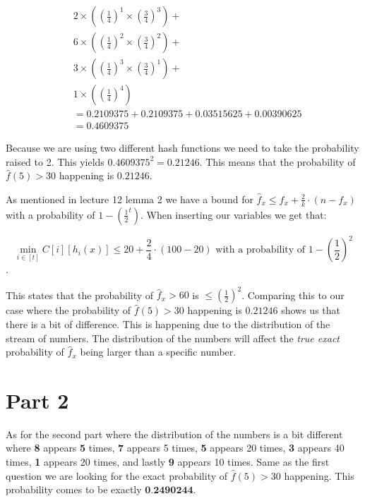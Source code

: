 \documentclass{article}
\begin{document}
\begin{align*}
&2 \times \left(\left(\frac{1}{4}\right)^1 \times \left(\frac{3}{4}\right)^3\right) + \\
&6 \times \left(\left(\frac{1}{4}\right)^2 \times \left(\frac{3}{4}\right)^2\right) + \\
&3 \times \left(\left(\frac{1}{4}\right)^3 \times \left(\frac{3}{4}\right)^1\right) + \\
&1 \times \left(\left(\frac{1}{4}\right)^4\right) \\
&= 0.2109375 + 0.2109375 + 0.03515625 + 0.00390625 \\
&= 0.4609375
\end{align*}

\noindent Because we are using two different hash functions we need to take the probability raised to 2. This yields \(0.4609375^2 = 0.21246\). This means that the probability of \(\hat{f}(5) > 30\) happening is \(0.21246\).

\noindent As mentioned in lecture 12 lemma 2 \cite{Lecture12} we have a bound for \(\hat{f}_x \leq f_x + \frac{2}{k} \cdot (n - f_x)\) with a probability of \(1-\left(\frac{1}{2}^t\right)\). When inserting our variables we get that:


\[\min_{i \in [t]} C[i][h_i(x)] \leq 20 + \frac{2}{4} \cdot (100 - 20) \text{ with a probability of } 1 - \left(\frac{1}{2}\right)^2\].

\noindent This states that the probability of \(\hat{f}_x > 60\) is \(\leq \left(\frac{1}{2}\right)^2\). Comparing this to our case where the probability of \(\hat{f}(5) > 30\) happening is \(0.21246\) shows us that there is a bit of difference. This is happening due to the distribution of the stream of numbers. The distribution of the numbers will affect the \textit{true exact} probability of \(\hat{f}_x\) being larger than a specific number.

\section{Part 2}
As for the second part where the distribution of the numbers is a bit different where \textbf{8} appears
\textbf{5} times,\textbf{ 7} appears 5 times, \textbf{5} appears 20 times,\textbf{ 3} appears 40 times,\textbf{ 1 }appears 20 times, and lastly \textbf{ 9} appears 10 times. Same as the first question we are looking for the exact probability of \(\hat{f}(5) > 30\) happening. This probability comes to be exactly \(\textbf{0.2490244}\). \\
\end{document}
